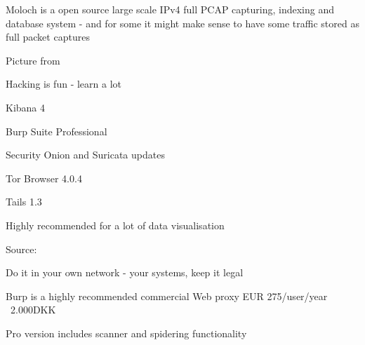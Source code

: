 \documentclass[20pt,landscape,a4paper,footrule]{foils}
\begin{document}


Moloch is a open source large scale IPv4 full PCAP capturing, indexing and database system
- and for some it might make sense to have some traffic stored as full packet captures

Picture from 


\begin{list1}
\item Hacking is fun - learn a lot
\item Kibana 4
\item Burp Suite Professional
\item Security Onion and Suricata updates
\item Tor Browser 4.0.4
\item Tails 1.3 
\end{list1}





\centerline{Highly recommended for a lot of data visualisation}

Source:








\begin{list1}

\item Do it in your own network - your systems, keep it legal
\item Burp is a highly recommended commercial Web proxy EUR 275/user/year ~2.000DKK
\item Pro version includes scanner and spidering functionality
\end{list1}


\end{document}
